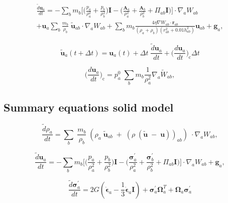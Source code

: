 \documentclass[preprint,12pt]{elsarticle}
\newcommand{\teng}[1]{\ensuremath{\boldsymbol{#1}}}
\newcommand{\ten}[1]{\ensuremath{\mathbf{#1}}}
\begin{document}
\begin{multline}
  \label{eq:sph-momentum-fluid}
  \frac{\tilde{d}\ten{u}_{a}}{dt} = - \sum_{b} m_b \bigg[
  \bigg(\frac{p_a}{\rho_a^2} + \frac{p_b}{\rho_b^2}\bigg) \ten{I} -
  \bigg(\frac{\ten{A}_a}{\rho_a^2} + \frac{\ten{A}_b}{\rho_b^2} + \Pi_{ab}
  \ten{I} \bigg) \bigg]
  \cdot \nabla_{a} W_{ab} \\
  + \ten{u}_{a} \sum_{b} \frac{m_b}{\rho_{b}} \; \tilde{\ten{u}}_{ab} \cdot
  \nabla_{a} W_{ab} + \sum_{b} m_b \frac{4 \eta \nabla W_{ab}\cdot
    \ten{r}_{ab}}{(\rho_a + \rho_b) (r_{ab}^2 + 0.01 h_{ab}^2)} \ten{u}_{ab} +
  \ten{g}_{a},
\end{multline}


\begin{equation}
  \label{eq:transport_velocity}
  \ten{\tilde{u}}_a(t + \Delta t) =\ten{u}_a(t) + \Delta t \; \frac{\tilde{d} \ten{u}_a}{dt} +
  \bigg(\frac{d \ten{u}_{a}}{dt}\bigg)_{\text{c}} \Delta t
\end{equation}


\begin{equation}
  \label{eq:gtvf_pst}
  \bigg(\frac{d \ten{u}_a}{dt}\bigg)_{\text{c}} = p_a^0 \;
  \sum_b m_b \frac{1}{\rho_a^2} \nabla_a \widetilde{W}_{ab} ,
\end{equation}


\subsection{Summary equations solid model}


\begin{equation}
  \label{eq:sph-discretization-continuity}
  \frac{\tilde{d}\rho_a}{dt} = \sum_{b} \; \frac{m_b}{\rho_{b}} \; (
  \rho_{a} \; \tilde{\ten{u}}_{ab} \; + \;
  (\rho \; (\tilde{\ten{u}} \; - \;
  \ten{u}))_{ab}) \; \cdot \nabla_{a} W_{ab},
\end{equation}


\begin{equation}
  \label{eq:sph-momentum-solid}
  \frac{\tilde{d}\ten{u}_{a}}{dt} = - \sum_{b} m_b \bigg[
  \bigg(\frac{p_a}{\rho_a^2} + \frac{p_b}{\rho_b^2}\bigg) \ten{I} -
  \bigg(\frac{\teng{\sigma}^{'}_{a}}{\rho_a^2} +
  \frac{\teng{\sigma}^{'}_{b}}{\rho_b^2} + \Pi_{ab} \ten{I} \bigg) \bigg]  \cdot \nabla_{a} W_{ab} +
  \ten{g}_{a},
\end{equation}

\begin{equation}
  \label{eq:sph-modified-jaumann-stress}
  \frac{\tilde{d}\teng{\sigma}^{'}_{a}}{dt} = 2G (\dot{\teng{\epsilon}}_{a} -
  \frac{1}{3} \dot{\teng{\epsilon}}_{a} \ten{I}) + \teng{\sigma}^{'}_{a}
  \teng{\Omega}_{a}^{T} +
  \teng{\Omega}_{a} \teng{\sigma}^{'}_{a}
\end{equation}
\end{document}
